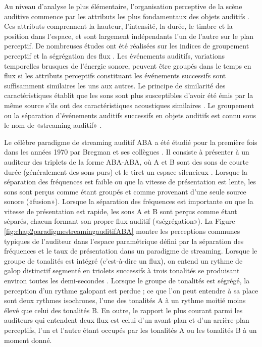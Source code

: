 Au niveau d'analyse le plus élémentaire, l'organisation perceptive de la scène auditive commence par les attributs les plus fondamentaux des objets auditifs \citep{dykstra2011neural}. 
Ces attributs comprennent la hauteur, l'intensité, la durée, le timbre et la position dans l'espace, et sont largement indépendants l'un de l'autre sur le plan perceptif. 
De nombreuses études ont été réalisées sur les indices de groupement perceptif et la ségrégation des flux \citep{bregman1994auditory, carlyon2004brain, darwin1997auditory}. 
Les événements auditifs, variations temporelles brusques de l'énergie sonore, peuvent être groupés dans le temps en flux si les attributs perceptifs constituant les événements successifs sont suffisamment similaires les uns aux autres. 
Le principe de similarité des caractéristiques établit que les sons sont plus susceptibles d'avoir été émis par la même source s'ils ont des caractéristiques acoustiques similaires \citep{moore2002factors, moore2012properties}. 
Le groupement ou la séparation d'événements auditifs successifs en objets auditifs est connu sous le nom de «streaming auditif» \citep{bregman1994auditory}. 

Le célèbre paradigme de streaming auditif ABA a été étudié pour la première fois dans les années 1970 par Bregman et ses collègues \citep{bregman1971primary}. 
Il consiste à présenter à un auditeur des triplets de la forme ABA-ABA, où A et B sont des sons de courte durée (généralement des sons purs) et le tiret un espace silencieux \citep{van1975temporal, van1977minimum}. 
Lorsque la séparation des fréquences est faible ou que la vitesse de présentation est lente, les sons sont perçus comme étant groupés et comme provenant d'une seule source sonore («fusion»). 
Lorsque la séparation des fréquences est importante ou que la vitesse de présentation est rapide, les sons A et B sont perçus comme étant séparés, chacun formant son propre flux auditif («ségrégation»). 
La Figure \ref{fig:chap2paradigmestreamingauditifABA} montre les perceptions communes typiques de l'auditeur dans l'espace paramétrique défini par la séparation des fréquences et le taux de présentation dans un paradigme de streaming. 
Lorsque le groupe de tonalités est intégré (c'est-à-dire un flux), on entend un rythme de galop distinctif segmenté en triolets successifs à trois tonalités se produisant environ toutes les demi-secondes \citep{dykstra2011neural}. 
Lorsque le groupe de tonalités est ségrégé, la perception d'un rythme galopant est perdue ; ce que l'on peut entendre à sa place sont deux rythmes isochrones, l'une des tonalités A à un rythme moitié moins élevé que celui des tonalités B. 
En outre, le rapport le plus courant parmi les auditeurs qui entendent deux flux est celui d'un avant-plan et d'un arrière-plan perceptifs, l'un et l'autre étant occupés par les tonalités A ou les tonalités B à un moment donné. 

